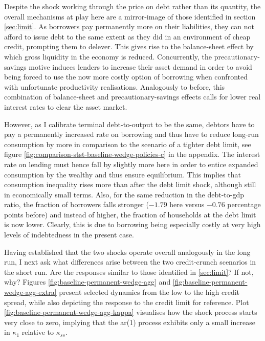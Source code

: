 \documentclass[a4paper,12pt]{article} %
\numberwithin{equation}{section} %
\numberwithin{figure}{section}
\numberwithin{table}{section}
\begin{document}
Despite the shock working through the price on debt rather than its quantity, the overall mechanisms at play here are a mirror-image of those identified in section \ref{sec:limit}. As borrowers pay permanently more on their liabilities, they can not afford to issue debt to the same extent as they did in an environment of cheap credit, prompting them to delever. This gives rise to the balance-sheet effect by which gross liquidity in the economy is reduced. Concurrently, the precautionary-savings motive induces lenders to increase their asset demand in order to avoid being forced to use the now more costly option of borrowing when confronted with unfortunate productivity realisations. Analogously to before, this combination of balance-sheet and precautionary-savings effects calls for lower real interest rates to clear the asset market. 

However, as I calibrate terminal debt-to-output to be the same, debtors have to pay a permanently increased rate on borrowing and thus have to reduce long-run consumption by more in comparison to the scenario of a tighter debt limit, see figure \ref{fig:comparison-stst-baseline-wedge-policies-c} in the appendix. The interest rate on lending must hence fall by slightly more here in order to entice expanded consumption by the wealthy and thus ensure equilibrium. This implies that consumption inequality rises more than after the debt limit shock, although still in economically small terms. Also, for the same reduction in the debt-to-\Gls{gdp} ratio, the fraction of borrowers falls stronger ($-1.79$ here versus $-0.76$ percentage points before) and instead of higher, the fraction of households at the debt limit is now lower. Clearly, this is due to borrowing being especially costly at very high levels of indebtedness in the present case.

Having established that the two shocks operate overall analogously in the long run, I next ask what differences arise between the two credit-crunch scenarios in the short run. Are the responses similar to those identified in \ref{sec:limit}? If not, why? Figures \ref{fig:baseline-permanent-wedge-agg} and \ref{fig:baseline-permanent-wedge-agg-extra} present selected dynamics from the low to the high credit spread, while also depicting the response to the credit limit for reference. Plot \ref{fig:baseline-permanent-wedge-agg-kappa} visualises how the shock process starts very close to zero, implying that the \Gls{ar}(1) process exhibits only a small increase in $\kappa_1$ relative to $\kappa_{ss}$. 
\end{document}
